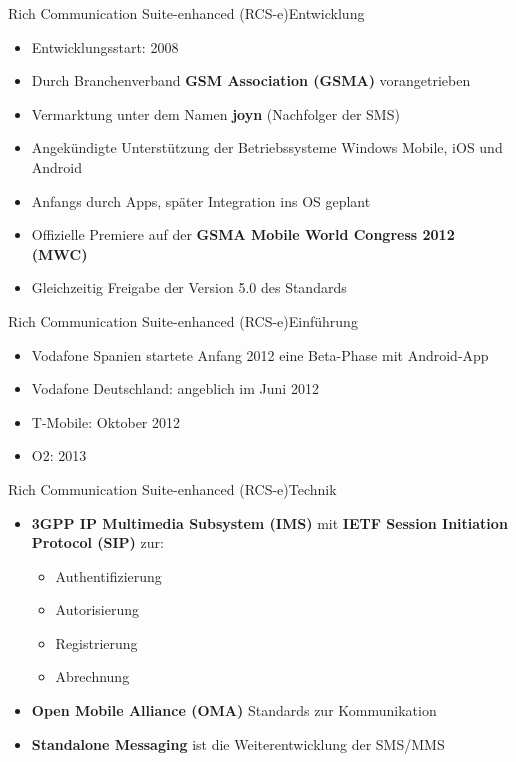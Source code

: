 \documentclass{beamer}
\begin{document}
\begin{frame}{Rich Communication Suite-enhanced (RCS-e)}{Entwicklung}
	\begin{itemize}
		\item Entwicklungsstart: 2008
		\item Durch Branchenverband \textbf{GSM Association (GSMA)} vorangetrieben
		\item Vermarktung unter dem Namen \textbf{joyn} (\glqq{}Nachfolger der SMS\grqq{})
		\item Angekündigte Unterstützung der Betriebssysteme Windows Mobile, iOS und Android
		\item Anfangs durch Apps, später Integration ins OS geplant
		\item Offizielle Premiere auf der \textbf{GSMA Mobile World Congress 2012 (MWC)}
		\item Gleichzeitig Freigabe der Version 5.0 des Standards
	\end{itemize}
\end{frame}

\begin{frame}{Rich Communication Suite-enhanced (RCS-e)}{Einführung}
\begin{itemize}
	\item Vodafone Spanien startete Anfang 2012 eine Beta-Phase mit Android-App
	\item Vodafone Deutschland: \glqq{}angeblich\grqq{} im Juni 2012
	\item T-Mobile: Oktober 2012
	\item O2: 2013
\end{itemize}
\end{frame}


\begin{frame}{Rich Communication Suite-enhanced (RCS-e)}{Technik\cite{rcs:spec}}
	\begin{itemize}
		\item \textbf{3GPP IP Multimedia Subsystem (IMS)} mit \textbf{IETF Session Initiation Protocol (SIP)} zur:
			\begin{itemize}
				\item Authentifizierung
				\item Autorisierung
				\item Registrierung
				\item Abrechnung
			\end{itemize}
		\item \textbf{Open Mobile Alliance (OMA)} Standards zur Kommunikation
		\item \textbf{Standalone Messaging} ist die Weiterentwicklung der SMS/MMS
	\end{itemize}
\end{frame}
\end{document}
